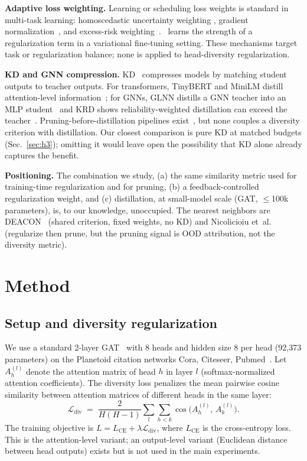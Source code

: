 \documentclass{ws-ijprai}
\newcommand{\Ldiv}{\mathcal{L}_{\mathrm{div}}}
\newcommand{\etal}{et~al.}
\begin{document}
\textbf{Adaptive loss weighting.} Learning or scheduling loss weights is
standard in multi-task learning: homoscedastic uncertainty weighting
\cite{kendall2018}, gradient normalization~\cite{gradnorm2018}, and excess-risk
weighting~\cite{excessmtl2024}.~\cite{harvey2024} learns the strength of a
regularization term in a variational fine-tuning setting. These mechanisms
target task or regularization balance; none is applied to head-diversity
regularization.

\textbf{KD and GNN compression.} KD~\cite{hinton2015} compresses models by
matching student outputs to teacher outputs. For transformers, TinyBERT and
MiniLM distill attention-level information~\cite{tinybert2020,minilm2020}; for
GNNs, GLNN distills a GNN teacher into an MLP student~\cite{glnn2022} and KRD
shows reliability-weighted distillation can exceed the teacher~\cite{krd2023}.
Pruning-before-distillation pipelines exist~\cite{parkno2021,epsd2024,ddk2024},
but none couples a diversity criterion with distillation. Our closest
comparison is pure KD at matched budgets (Sec.~\ref{sec:h3}); omitting it
would leave open the possibility that KD alone already captures the benefit.

\noindent\textbf{Positioning.} The combination we study, (a) the same
similarity metric used for training-time regularization and for pruning, (b) a
feedback-controlled regularization weight, and (c) distillation, at small-model
scale (GAT, $\leq$100k parameters), is, to our knowledge, unoccupied. The
nearest neighbors are DEACON~\cite{deacon2024} (shared criterion, fixed
weights, no KD) and Nicolicioiu \etal{}~\cite{nicolicioiu2023} (regularize then
prune, but the pruning signal is OOD attribution, not the diversity metric).

\section{Method}

\subsection{Setup and diversity regularization}

We use a standard 2-layer GAT~\cite{velickovic2018} with 8 heads and hidden
size 8 per head (92{,}373 parameters) on the Planetoid citation networks Cora,
Citeseer, Pubmed~\cite{yang2016}. Let $A_h^{(l)}$ denote the attention matrix
of head $h$ in layer $l$ (softmax-normalized attention coefficients). The
diversity loss penalizes the mean pairwise cosine similarity between attention
matrices of different heads in the same layer:
\begin{equation}
\Ldiv \;=\; \frac{2}{H(H-1)} \sum_{l} \sum_{h<k}
\cos\!\big(A_h^{(l)},\, A_k^{(l)}\big).
\label{eq:ldiv}
\end{equation}
The training objective is $L = L_{\mathrm{CE}} + \lambda \Ldiv$, where
$L_{\mathrm{CE}}$ is the cross-entropy loss. This is the attention-level
variant; an output-level variant (Euclidean distance between head outputs)
exists but is not used in the main experiments.
\end{document}
